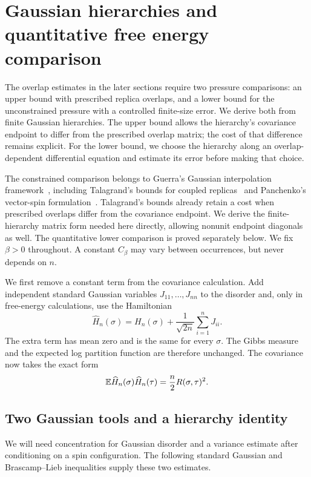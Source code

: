\section{Gaussian hierarchies and quantitative free energy comparison}
\label{static-sec:gaussian}

The overlap estimates in the later sections require two pressure comparisons:
an upper bound with prescribed replica overlaps, and a lower bound for the
unconstrained pressure with a controlled finite-size error. We derive both
from finite Gaussian hierarchies. The upper bound allows the hierarchy's
covariance endpoint to differ from the prescribed overlap matrix; the cost
of that difference remains explicit. For the lower bound, we choose the
hierarchy along an overlap-dependent differential equation and estimate its
error before making that choice.

The constrained comparison belongs to Guerra's Gaussian interpolation
framework~\cite{Guerra03}, including Talagrand's bounds for coupled
replicas~\cite[Propositions~3.4 and~4.4]{Talagrand07} and Panchenko's
vector-spin formulation~\cite{Panchenko18}. Talagrand's bounds already
retain a cost when prescribed overlaps differ from the covariance
endpoint. We derive the finite-hierarchy matrix form needed here
directly, allowing nonunit endpoint diagonals as well. The quantitative
lower comparison is proved separately below.
We fix $\beta>0$ throughout. A constant $C_\beta$ may vary between
occurrences, but never depends on $n$.

We first remove a constant term from the covariance calculation. Add
independent standard Gaussian variables $J_{11},\ldots,J_{nn}$ to the
disorder and, only in free-energy calculations, use the Hamiltonian
\[
 \widehat H_n(\sigma)
 =H_n(\sigma)+\frac1{\sqrt{2n}}\sum_{i=1}^nJ_{ii}.
\]
The extra term has mean zero and is the same for every $\sigma$.
The Gibbs measure and the expected log partition function are therefore
unchanged. The covariance now takes the exact form
\begin{equation}\label{static-eq:hamiltonian-covariance}
 \mathbb E\widehat H_n(\sigma)\widehat H_n(\tau)
 =\frac n2R(\sigma,\tau)^2.
\end{equation}

\subsection{Two Gaussian tools and a hierarchy identity}

We will need concentration for Gaussian disorder and a variance estimate
after conditioning on a spin configuration. The following standard
Gaussian and Brascamp--Lieb inequalities supply these two estimates.

